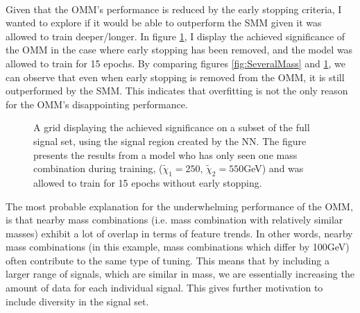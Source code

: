 \\
Given that the \ac{OMM}'s performance is reduced by the early stopping criteria, I wanted to explore if it would be able to outperform the 
\ac{SMM} given it was allowed to train deeper/longer. In figure \ref{fig:NNOverfitting}, I display the achieved significance
of the \ac{OMM} in the case where early stopping has been removed, and the model was allowed to train for 15 epochs. By comparing figures 
\ref{fig:SeveralMass} and \ref{fig:NNOverfitting}, we can observe that even when early stopping is removed from the \ac{OMM}, it is  
still outperformed by the \ac{SMM}. This indicates that overfitting is not the only reason for the \ac{OMM}'s disappointing performance.\\
\begin{figure}
    \centering
    \caption[A grid displaying the achieved significance on a subset of the full signal set, using the signal region 
    created by a dense \acs{NN} which has trained on one mass, and has been allowed to train for 16 epochs.]{
    A grid displaying the achieved significance on a subset of the full signal set, using the signal region 
    created by the \ac{NN}. The figure presents the results from a model who has only seen one mass combination 
    during training, ($\tilde{\chi}_1=250$, $\tilde{\chi}_2=550$GeV) and was allowed to train for 15 epochs without 
    early stopping.}
    \label{fig:NNOverfitting}
\end{figure}
The most probable explanation for the underwhelming performance of the \ac{OMM}, is that nearby mass combinations (i.e. mass combination with 
relatively similar masses) exhibit a lot of overlap in terms of feature trends. In other words, nearby mass combinations (in this example, mass combinations which 
differ by 100GeV) often contribute to the same type of tuning. This means that by including a larger range of signals, which are similar in mass, we are 
essentially increasing the amount of data for each individual signal. This gives further motivation to include diversity in the signal set.